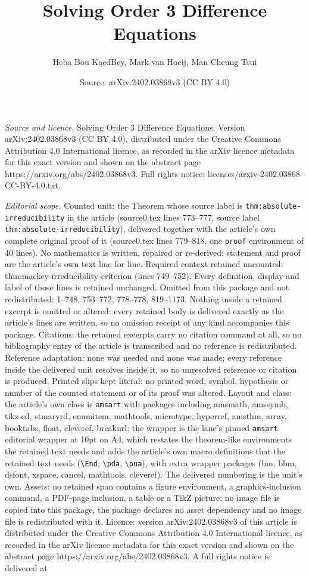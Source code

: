 \documentclass[10pt,a4paper]{amsart}
\title[Solving Order 3 Difference Equations]{Solving Order 3 Difference Equations}
\author{Heba Bou KaedBey, Mark van Hoeij, Man Cheung Tsui}
\date{Source: arXiv:2402.03868v3 (CC BY 4.0)}
\begin{document}
\maketitle

\noindent\emph{Source and licence.} Solving Order 3 Difference Equations. Version arXiv:2402.03868v3 (CC BY 4.0), distributed under the Creative Commons Attribution 4.0 International licence, as recorded in the arXiv licence metadata for this exact version and shown on the abstract page https://arxiv.org/abs/2402.03868v3. Full rights notice: licenses/arxiv-2402.03868-CC-BY-4.0.txt.\par\smallskip

\noindent\textit{Editorial scope.} Counted unit: the Theorem whose source label is \texttt{thm:absolute-irreducibility} in the article (source0.tex lines 773--777, source label \texttt{thm:absolute-irreducibility}), delivered together with the article's own complete original proof of it (source0.tex lines 779--818, one \texttt{proof} environment of 40 lines). No mathematics is written, repaired or re-derived: statement and proof are the article's own text line for line. Required context retained uncounted: thm:mackey-irreducibility-criterion (lines 749--752). Every definition, display and label of those lines is retained unchanged. Omitted from this package and not redistributed: 1--748, 753--772, 778--778, 819--1173. Nothing inside a retained excerpt is omitted or altered: every retained body is delivered exactly as the article's lines are written, so no omission receipt of any kind accompanies this package. Citations: the retained excerpts carry no citation command at all, so no bibliography entry of the article is transcribed and no reference is redistributed. Reference adaptation: none was needed and none was made; every reference inside the delivered unit resolves inside it, so no unresolved reference or citation is produced. Printed slips kept literal: no printed word, symbol, hypothesis or number of the counted statement or of its proof was altered. Layout and class: the article's own class is \texttt{amsart} with packages including amsmath, amssymb, tikz-cd, stmaryrd, enumitem, mathtools, microtype, hyperref, amsthm, array, booktabs, float, cleveref, breakurl; the wrapper is the lane's pinned \texttt{amsart} editorial wrapper at 10pt on A4, which restates the theorem-like environments the retained text needs and adds the article's own macro definitions that the retained text needs (\texttt{\textbackslash End}, \texttt{\textbackslash pda}, \texttt{\textbackslash pua}), with extra wrapper packages (bm, bbm, dsfont, xspace, cancel, mathtools, cleveref). The delivered numbering is the unit's own. Assets: no retained span contains a figure environment, a graphics-inclusion command, a PDF-page inclusion, a table or a TikZ picture; no image file is copied into this package, the package declares no asset dependency and no image file is redistributed with it. Licence: version arXiv:2402.03868v3 of this article is distributed under the Creative Commons Attribution 4.0 International licence, as recorded in the arXiv licence metadata for this exact version and shown on the abstract page https://arxiv.org/abs/2402.03868v3. A full rights notice is delivered at 
\end{document}
